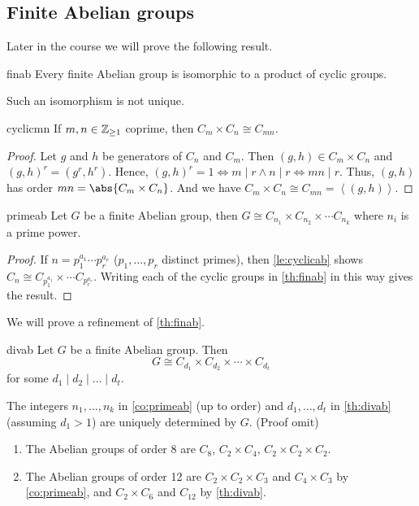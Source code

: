 \subsection{Finite Abelian groups}
Later in the course we will prove the following result.
\begin{theorem}{}{finab}
    Every finite Abelian group is isomorphic to a product of cyclic groups.
\end{theorem}
\begin{note}
    Such an isomorphism is not unique.
\end{note}
\begin{lemma}{}{cyclicmn}
    If \(m, n \in \mathbb{\MakeUppercase{Z}}_{\geq 1}\) coprime, then \(C_m \times C_n \cong C_{mn}\).
\end{lemma}
\begin{proof}
    Let \(g\) and \(h\) be generators of \(C_n\) and \(C_m\). Then \((g, h) \in C_m \times C_n\) and \((g, h)^r = (g^r, h^r)\). Hence, \((g, h)^r = 1 \iff m \mid r \land n \mid r \iff mn \mid r\). Thus, \((g,h)\) has order \(mn = \abs{C_m \times C_n} \). And we have \( C_m \times C_n \cong C_{mn} = \left\langle(g,h)\right\rangle \).
\end{proof}
\begin{corollary}{}{primeab}
    Let \(G\) be a finite Abelian group, then \(G \cong C_{n_1} \times C_{n_2} \times \cdots C_{n_k}\) where \(n_i\) is a prime power.
\end{corollary}
\begin{proof}
    If \(n = p_1^{a_1}\cdots p_r^{a_r}\) (\(p_1,\ldots,p_r\) distinct primes), then \cref{le:cyclicab} shows \(C_n \cong C_{p_1^{a_1}}\times \cdots C_{p_r^{a_r}}\). Writing each of the cyclic groups in \cref{th:finab} in this way gives the result.
\end{proof}
We will prove a refinement of \cref{th:finab}.
\begin{theorem}{}{divab}
    Let \(G\) be a finite Abelian group. Then
    \[G \cong C_{d_1}\times C_{d_2} \times \cdots \times C_{d_t}\]
    for some \(d_1 \mid d_2 \mid \dots \mid d_t\).
\end{theorem}
\begin{remark}
    The integers \(n_1, \ldots, n_k\) in \cref{co:primeab} (up to order) and \(d_1, \ldots, d_t\) in \cref{th:divab} (assuming \(d_1 > 1\)) are uniquely determined by \(G\). (Proof omit)
\end{remark}
\begin{example}
    \leavevmode
    \begin{enumerate}
        \item The Abelian groups of order 8 are \(C_8\), \(C_2 \times C_4\), \(C_2 \times C_2 \times C_2\).
        \item The Abelian groups of order 12 are \(C_2 \times C_2 \times C_3\) and \(C_4 \times C_3\) by \cref{co:primeab}, and \(C_2 \times C_6\) and \(C_{12}\) by \cref{th:divab}.
    \end{enumerate}
\end{example}
